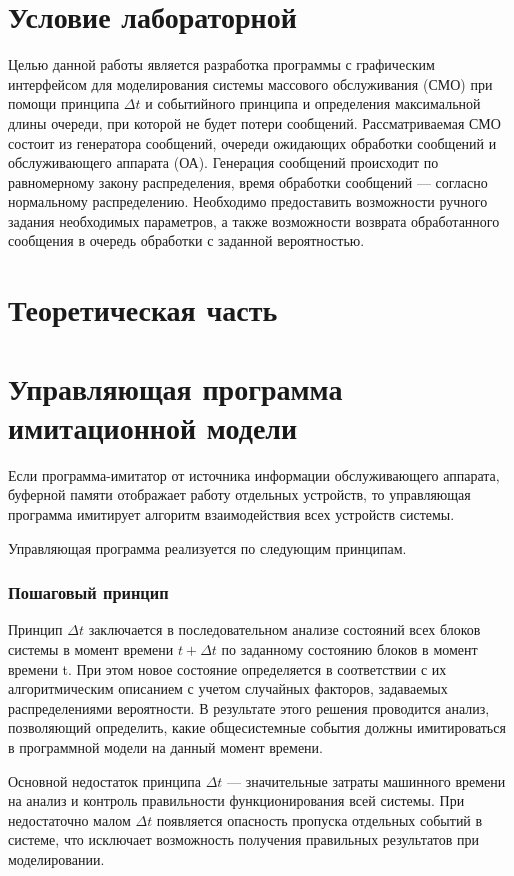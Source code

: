 \section{Условие лабораторной}

Целью данной работы является разработка программы с графическим интерфейсом для моделирования системы массового обслуживания (СМО) при помощи принципа $\Delta t$ и событийного принципа и определения максимальной длины очереди, при которой не будет потери сообщений. Рассматриваемая СМО состоит из генератора сообщений, очереди ожидающих обработки сообщений и обслуживающего аппарата (ОА). Генерация сообщений происходит по равномерному закону распределения, время обработки сообщений --- согласно нормальному распределению. Необходимо предоставить возможности ручного задания необходимых параметров, а также возможности возврата обработанного сообщения в очередь обработки с заданной вероятностью.


\section{Теоретическая часть}

\section{Управляющая программа имитационной модели}

Если программа-имитатор от источника информации обслуживающего аппарата, буферной памяти отображает работу отдельных устройств, то управляющая программа имитирует алгоритм взаимодействия всех устройств системы.

Управляющая программа реализуется по следующим принципам.

\subsubsection*{Пошаговый принцип}

Принцип $\Delta t$ заключается в последовательном анализе состояний всех блоков системы в момент времени $t + \Delta t$ по заданному состоянию блоков в момент времени t. При этом новое состояние определяется в соответствии с их алгоритмическим описанием с учетом случайных факторов, задаваемых распределениями вероятности. В результате этого решения проводится анализ, позволяющий определить, какие общесистемные события должны имитироваться в программной модели на данный момент времени.

Основной недостаток принципа $\Delta t$ --- значительные затраты машинного времени на анализ и контроль правильности функционирования всей системы. При недостаточно малом $\Delta t$ появляется опасность пропуска отдельных событий в системе, что исключает возможность получения правильных результатов при моделировании.

